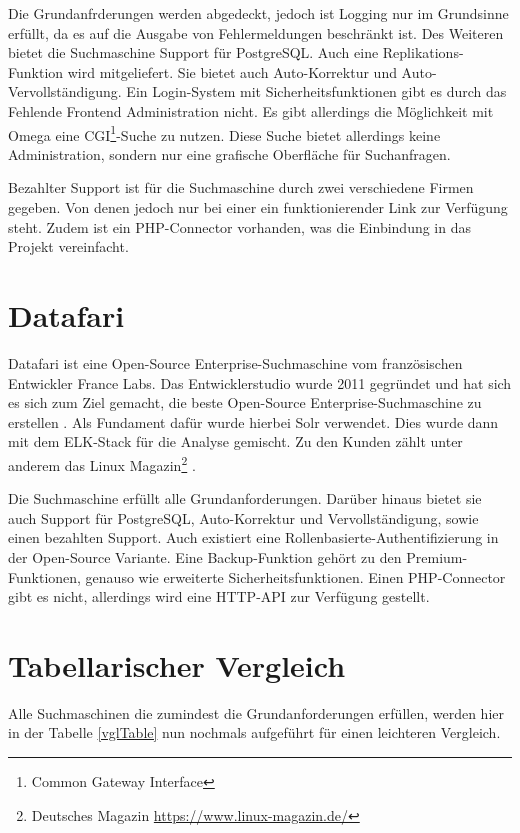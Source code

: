 Die Grundanfrderungen werden abgedeckt, jedoch ist Logging nur im Grundsinne erfüllt, da es auf die Ausgabe von Fehlermeldungen beschränkt ist. Des Weiteren bietet die Suchmaschine Support für PostgreSQL. Auch eine Replikations-Funktion wird mitgeliefert. Sie bietet auch Auto-Korrektur und Auto-Vervollständigung. Ein Login-System mit Sicherheitsfunktionen gibt es durch das Fehlende Frontend Administration nicht. Es gibt allerdings die Möglichkeit mit Omega eine CGI\footnote{Common Gateway Interface}-Suche zu nutzen. Diese Suche bietet allerdings keine Administration, sondern nur eine grafische Oberfläche für Suchanfragen.

Bezahlter Support ist für die Suchmaschine durch zwei verschiedene Firmen gegeben. Von denen jedoch nur bei einer ein funktionierender Link zur Verfügung steht. Zudem ist ein PHP-Connector vorhanden, was die Einbindung in das Projekt vereinfacht. \cite{XAP.2019}

\section{Datafari}
\label{datafari}

Datafari ist eine Open-Source Enterprise-Suchmaschine vom französischen Entwickler France Labs. Das Entwicklerstudio wurde 2011 gegründet und hat sich es sich zum Ziel gemacht, die beste Open-Source Enterprise-Suchmaschine zu erstellen \cite{Labs.2019}. Als Fundament dafür wurde hierbei Solr verwendet. Dies wurde dann mit dem ELK-Stack für die Analyse gemischt. Zu den Kunden zählt unter anderem das Linux Magazin\footnote{Deutsches Magazin \url{https://www.linux-magazin.de/}} \cite{MichaelBrandenburg.2019}. 

Die Suchmaschine erfüllt alle Grundanforderungen. Darüber hinaus bietet sie auch Support für PostgreSQL, Auto-Korrektur und Vervollständigung, sowie einen bezahlten Support. Auch existiert eine Rollenbasierte-Authentifizierung in der Open-Source Variante. Eine Backup-Funktion gehört zu den Premium-Funktionen, genauso wie erweiterte Sicherheitsfunktionen. Einen PHP-Connector gibt es nicht, allerdings wird eine HTTP-API zur Verfügung gestellt. \cite{Labs.b}

\section{Tabellarischer Vergleich}

Alle Suchmaschinen die zumindest die Grundanforderungen erfüllen, werden hier in der Tabelle \ref{vglTable} nun nochmals aufgeführt für einen leichteren Vergleich.

